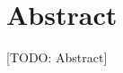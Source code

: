\documentclass[../../Thesis.tex]{subfiles}
\begin{document}
\section{Abstract}
[TODO: Abstract]
\end{document}
